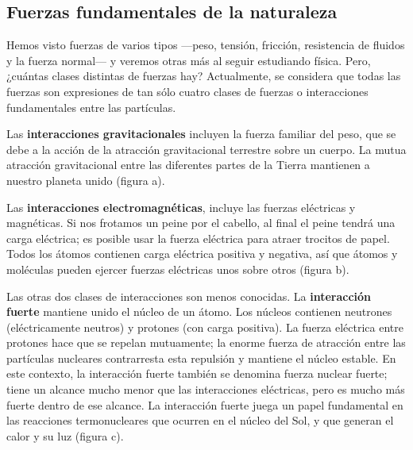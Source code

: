 \documentclass{article}
\newcommand{\newsubsection}[1]{
    \subsection{\color{sectionColor} #1}
}
\newcommand{\bl}[1]{\textbf{#1}}
\begin{document}
    \newsubsection{Fuerzas fundamentales de la naturaleza}

    \par Hemos visto fuerzas de varios tipos —peso, tensión, fricción, resistencia de fluidos y la fuerza normal— y veremos otras más al seguir estudiando física. Pero, ¿cuántas clases distintas de fuerzas hay? Actualmente, se considera que todas las fuerzas son expresiones de tan sólo cuatro clases de fuerzas o interacciones fundamentales entre las partículas.

    \begin{multicols}{2}

        \begin{minipage}{0.6\textwidth}

            \par Las \bl{interacciones gravitacionales} incluyen la fuerza familiar del peso, que se debe a la acción de la atracción gravitacional terrestre sobre un cuerpo. La mutua atracción gravitacional entre las diferentes partes de la Tierra mantienen a nuestro planeta unido (figura a).

            \vspace{0.2cm}

            \par Las \bl{interacciones electromagnéticas}, incluye las fuerzas eléctricas y magnéticas. Si nos frotamos un peine por el cabello, al final el peine tendrá una carga eléctrica; es posible usar la fuerza eléctrica para atraer trocitos de papel. Todos los átomos contienen carga eléctrica positiva y negativa, así que átomos y moléculas pueden ejercer fuerzas eléctricas unos sobre otros (figura b).

            \vspace{0.2cm}

            \par Las otras dos clases de interacciones son menos conocidas. La \bl{interacción fuerte} mantiene unido el núcleo de un átomo. Los núcleos contienen neutrones (eléctricamente neutros) y protones (con carga positiva). La fuerza eléctrica entre protones hace que se repelan mutuamente; la enorme fuerza de atracción entre las partículas nucleares contrarresta esta repulsión y mantiene el núcleo estable. En este contexto, la interacción fuerte también se denomina fuerza nuclear fuerte; tiene un alcance mucho menor que las interacciones eléctricas, pero es mucho más fuerte dentro de ese alcance. La interacción fuerte juega un papel fundamental en las reacciones termonucleares que ocurren en el núcleo del Sol, y que generan el calor y su luz (figura c).


\end{minipage}
\end{multicols}
\end{document}
